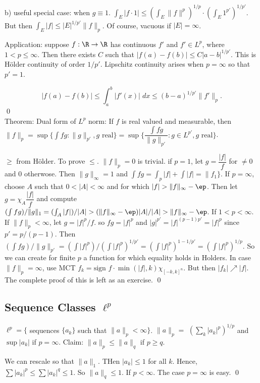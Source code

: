 b) useful special case: when $g \equiv 1$. $\int_E |f \cdot 1| \leq (\int_E \|f\|^p)^{1/p} \cdot (\int_E 1^{p'})^{1/p'}$. But then $\int_E |f| \leq |E|^{1/p'} \|f\|_p$. Of course, vacuous if $|E|=\infty$.

Application: suppose $f: \R \to \R$ has continuous $f'$ and $f' \in L^p$, where $1< p \leq \infty$. Then there exists $C$ such that $|f(a)-f(b)| \leq C |a-b|^{1/p'}$. This is H\"older continuity of order $1/p'$. Lipschitz continuity arises when $p=\infty$ so that $p'=1$. 

	\[
	| f(a) - f(b)| \leq \int_a^b |f'(x)| \; dx \leq (b-a)^{1/p'} \|f'\|_p.
	\]
\qed \\


Theorem: Dual form of $L^p$ norm: 
If $f$ is real valued and measurable, then $\|f\|_p = \sup \{ \int fg \colon \|g\|_{p'}, g \text{ real} \}= \sup \{ \dfrac{\int fg}{\|g\|_{p'}} \colon g \in L^{p'}, g \text{ real}\}$. 

\pf $\geq$ from H\"older. To prove $\leq$. $\|f\|_p=0$ is trivial. if $p=1$, let $g = \dfrac{|f|}{f}$ for $\neq 0$ and 0 otherwose. Then $\|g\|_\infty = 1$ and $\int fg = \int_p |f| + \int |f| = \|f_1\}$. If $p=\infty$, choose $A$ such that $0<|A|<\infty$ and for which $|f|>\|f\|_\infty - \ep$. Then let $g = \chi_A \dfrac{|f|}{f}$ and compute $(\int fg)/ \|g\|_1= (\int_A |f|)/|A|> (\|f\|_\infty - \ep)|A|/|A|> \|f\|_\infty - \ep$. If $1<p<\infty$. If $\|f\|_p < \infty$, let $g= |f|^p/f$. so $fg= |f|^p$ and $|g|^{p'}= |f|^{(p-1)p'}= |f|^p$ since $p'= p/(p-1)$. Then $(\int fg) / \|g\|_{p'}= (\int |f|^p)/ (\int |f|^p)^{1/p'}= (\int |f|^p)^{1-1/p'}= (\int |f|^p)^{1/p}$. So we can create for finite $p$ a function for which equality holds in Holders. In case $\|f\|_p= \infty$, use MCT $f_k = \text{sign }f \cdot \min(|f|,k) \chi_{[-k,k]^n}$. But then $|f_k| \nearrow |f|$. The complete proof of this is left as an exercise. \qed \\




\subsection{Sequence Classes $\ell^p$}

$\ell^p= \{$ sequences $\{a_k\}$ such that $\|a\|_p<\infty\}$. $\|a\|_p=$ $(\sum_k |a_k|^p)^{1/p}$ and $\sup |a_k|$ if $p=\infty$. Claim: $\|a\|_p \leq \|a\|_q$ if $p \geq q$.  

\pf We can rescale so that $\|a\|_1$. THen $|a_k| \leq 1$ for all $k$. Hence, $\sum |a_k|^p \leq \sum |a_k|^q \leq 1$. So $\|a\|_q \leq 1$. If $p<\infty$. The case $p=\infty$ is easy. \qed \\

